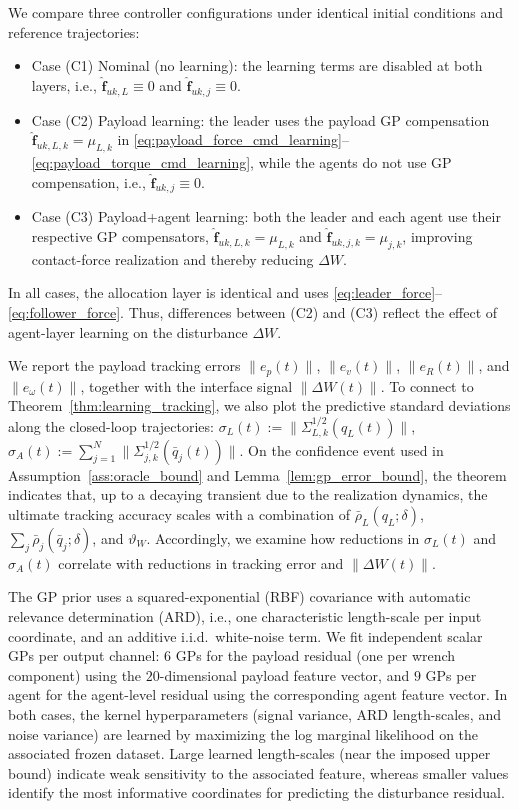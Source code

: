 \documentclass[letterpaper, 10 pt, conference]{ieeeconf}  %
\newcommand{\0}{\matr{0}}
\begin{document}
We compare three controller configurations under identical initial conditions and reference trajectories:

\begin{itemize}
\item Case (C1) Nominal (no learning):
the learning terms are disabled at both layers, i.e., $\hat{\mathbf f}_{uk,L}\equiv 0$ and $\hat{\mathbf f}_{uk,j}\equiv 0$.
\item Case (C2) Payload learning:
the leader uses the payload GP compensation $\hat{\mathbf f}_{uk,L,k}=\mu_{L,k}$ in
\eqref{eq:payload_force_cmd_learning}--\eqref{eq:payload_torque_cmd_learning}, while the agents do not use GP compensation, i.e.,
$\hat{\mathbf f}_{uk,j}\equiv 0$.
\item Case (C3) Payload+agent learning:
both the leader and each agent use their respective GP compensators,
$\hat{\mathbf f}_{uk,L,k}=\mu_{L,k}$ and $\hat{\mathbf f}_{uk,j,k}=\mu_{j,k}$, improving contact-force realization and thereby reducing $\Delta W$.
\end{itemize}

In all cases, the allocation layer is identical and uses \eqref{eq:leader_force}--\eqref{eq:follower_force}.
Thus, differences between (C2) and (C3) reflect the effect of agent-layer learning on the disturbance $\Delta W$.


We report the payload tracking errors $\|e_p(t)\|$, $\|e_v(t)\|$, $\|e_R(t)\|$, and $\|e_\omega(t)\|$,
together with the interface signal $\|\Delta W(t)\|$.
To connect to Theorem~\ref{thm:learning_tracking}, we also plot the predictive standard deviations along the closed-loop trajectories: $\sigma_L(t) := \|\Sigma_{L,k}^{1/2}(q_L(t))\|$, $\sigma_A(t):= \sum_{j=1}^N \|\Sigma_{j,k}^{1/2}(\bar q_j(t))\|$. On the confidence event used in Assumption~\ref{ass:oracle_bound} and Lemma~\ref{lem:gp_error_bound},
the theorem indicates that, up to a decaying transient due to the realization dynamics,
the ultimate tracking accuracy scales with a combination of $\bar\rho_L(q_L;\delta)$, $\sum_j \bar\rho_j(\bar q_j;\delta)$, and $\vartheta_W$.
Accordingly, we examine how reductions in $\sigma_L(t)$ and $\sigma_A(t)$ correlate with reductions in tracking error and  $\|\Delta W(t)\|$.

The GP prior uses a squared-exponential (RBF) covariance with automatic relevance determination (ARD), i.e., one characteristic length-scale per input coordinate, and an additive i.i.d.\ white-noise term. We fit independent scalar GPs per output channel: $6$ GPs for the payload residual (one per wrench component) using the $20$-dimensional payload feature vector, and $9$ GPs per agent for the agent-level residual using the corresponding agent feature vector. In both cases, the kernel hyperparameters (signal variance, ARD length-scales, and noise variance) are learned by maximizing the log marginal likelihood on the associated frozen dataset. Large learned length-scales (near the imposed upper bound) indicate weak sensitivity to the associated feature, whereas smaller values identify the most informative coordinates for predicting the disturbance residual.
\end{document}
